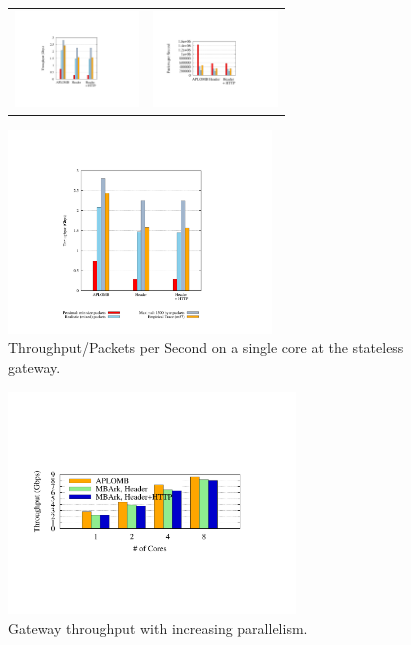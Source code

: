 \begin{figure}[t]
  \centering
  \begin{tabular}{cc}
  \includegraphics[height=1in]{fig/gatewayxput}&
  \includegraphics[height=1in]{fig/gateway_pps}\\
  \end{tabular}
  \includegraphics[width=2.75in]{fig/key}
  \caption[]{\label{fig:gwxput} Throughput/Packets per Second on a single core at the stateless gateway.}
\end{figure}

\begin{figure}[t]
  \centering
  \includegraphics[width=3in]{fig/gateway_scale}
  \caption[]{\label{fig:gwscale} Gateway throughput with increasing parallelism.}
\end{figure}
 
